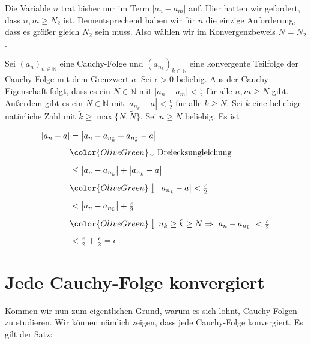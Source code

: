 \documentclass[fontsize=9pt,
               parskip=half-,
               DIV=14,
               listof=chapterentry,
               tocflat]{scrbook}
\begin{document}
\begin{solutionprocess*}
Die Variable $n$ trat bisher nur im Term $|a_{n}-a_{m}|$ auf. Hier hatten wir gefordert, dass $n,m\geq N_{2}$ ist. Dementsprechend haben wir für $n$ die einzige Anforderung, dass es größer gleich $N_{2}$ sein muss. Also wählen wir im Konvergenzbeweis $N=N_{2}$.

\end{solutionprocess*}

\begin{proof*}
Sei $(a_{n})_{n\in \mathbb {N} }$ eine Cauchy-Folge und $\left(a_{n_{k}}\right)_{k\in \mathbb {N} }$ eine konvergente Teilfolge der Cauchy-Folge mit dem Grenzwert $a$. Sei $\epsilon >0$ beliebig. Aus der Cauchy-Eigenschaft folgt, dass es ein $N\in \mathbb {N} $ mit $|a_{n}-a_{m}|<{\tfrac {\epsilon }{2}}$ für alle $n,m\geq N$ gibt. Außerdem gibt es ein ${\tilde {N}}\in \mathbb {N} $ mit $\left|a_{n_{k}}-a\right|<{\tfrac {\epsilon }{2}}$ für alle $k\geq {\tilde {N}}$. Sei ${\tilde {k}}$ eine beliebige natürliche Zahl mit ${\tilde {k}}\geq \max\{N,{\tilde {N}}\}$. Sei $n\geq N$ beliebig. Es ist

\begin{align*}
|a_{n}-a|&=\left|a_{n}-a_{n_{\tilde {k}}}+a_{n_{\tilde {k}}}-a\right|\\[0.5em]&{\color {OliveGreen}\left\downarrow \ {\text{Dreiecksungleichung}}\right.}\\[0.5em]&\leq \left|a_{n}-a_{n_{\tilde {k}}}\right|+\left|a_{n_{\tilde {k}}}-a\right|\\[0.5em]&{\color {OliveGreen}\left\downarrow \ \left|a_{n_{\tilde {k}}}-a\right|<{\tfrac {\epsilon }{2}}\right.}\\[0.5em]&<\left|a_{n}-a_{n_{\tilde {k}}}\right|+{\tfrac {\epsilon }{2}}\\[0.5em]&{\color {OliveGreen}\left\downarrow \ n_{k}\geq {\tilde {k}}\geq N\Rightarrow \left|a_{n}-a_{n_{\tilde {k}}}\right|<{\tfrac {\epsilon }{2}}\right.}\\[0.5em]&<{\tfrac {\epsilon }{2}}+{\tfrac {\epsilon }{2}}=\epsilon 
\end{align*}

\end{proof*}

\section{Jede Cauchy-Folge konvergiert}

Kommen wir nun zum eigentlichen Grund, warum es sich lohnt, Cauchy-Folgen zu studieren. Wir können nämlich zeigen, dass jede Cauchy-Folge konvergiert. Es gilt der Satz:
\end{document}

